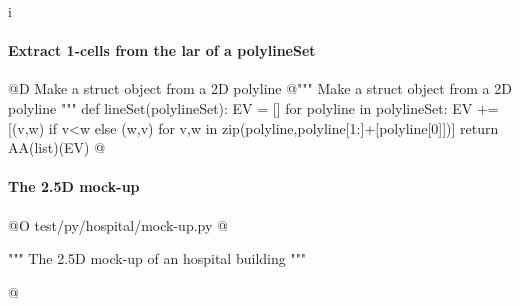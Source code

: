 i\documentclass[11pt,oneside]{article}    %
\begin{document}
\paragraph{Extract 1-cells from the lar of a polylineSet}
@D Make a struct object from a 2D polyline
@{""" Make a struct object from a 2D polyline """
def lineSet(polylineSet):
    EV = []
    for polyline in polylineSet:
        EV += [(v,w) if v<w else (w,v) for v,w in zip(polyline,polyline[1:]+[polyline[0]])]
    return AA(list)(EV)
@}
    

\paragraph{The 2.5D mock-up}
@O test/py/hospital/mock-up.py
@{""" The 2.5D mock-up of an hospital building """

@}




\end{document}
